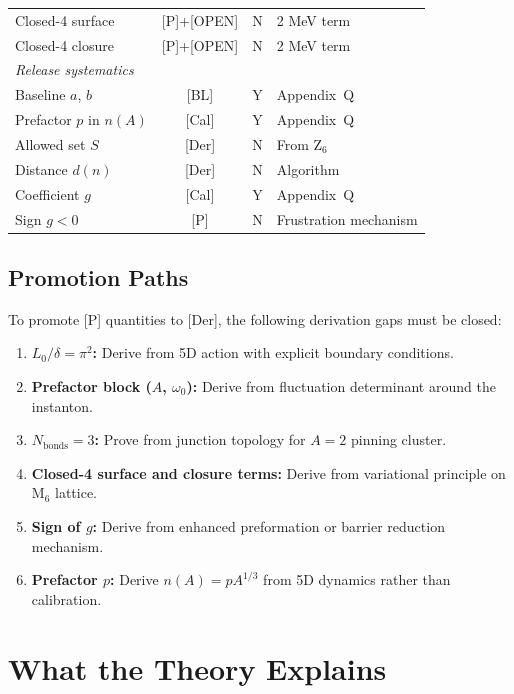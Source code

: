 \begin{table}[htbp]
\begin{tabular}{lccl}
    Closed-4 surface & [P]+[OPEN] & N & 2 MeV term \\
    Closed-4 closure & [P]+[OPEN] & N & 2 MeV term \\
    \midrule
    \multicolumn{4}{l}{\textit{Release systematics}} \\
    Baseline $a$, $b$ & [BL] & Y & Appendix~Q \\
    Prefactor $p$ in $n(A)$ & [Cal] & Y & Appendix~Q \\
    Allowed set $S$ & [Der] & N & From Z$_6$ \\
    Distance $d(n)$ & [Der] & N & Algorithm \\
    Coefficient $g$ & [Cal] & Y & Appendix~Q \\
    Sign $g < 0$ & [P] & N & Frustration mechanism \\
    \bottomrule
\end{tabular}
\end{table}

\subsection{Promotion Paths}

To promote [P] quantities to [Der], the following derivation gaps must
be closed:

\begin{enumerate}
    \item \textbf{$L_0/\delta = \pi^2$:} Derive from 5D action with
          explicit boundary conditions.
    \item \textbf{Prefactor block ($A$, $\omega_0$):} Derive from
          fluctuation determinant around the instanton.
    \item \textbf{$N_{\text{bonds}} = 3$:} Prove from junction topology
          for $A = 2$ pinning cluster.
    \item \textbf{Closed-4 surface and closure terms:} Derive from
          variational principle on M$_6$ lattice.
    \item \textbf{Sign of $g$:} Derive from enhanced preformation or
          barrier reduction mechanism.
    \item \textbf{Prefactor $p$:} Derive $n(A) = p A^{1/3}$ from 5D
          dynamics rather than calibration.
\end{enumerate}

\section{What the Theory Explains}
\label{sec:unified:explains}

